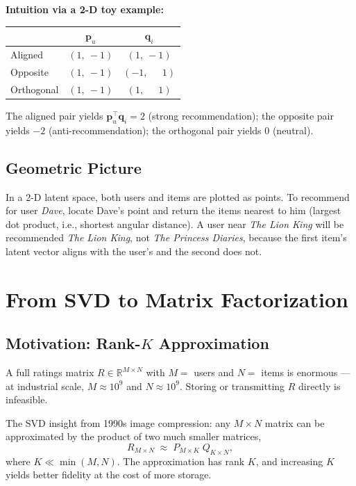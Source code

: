 \documentclass[11pt]{article}
\begin{document}
\textbf{Intuition via a 2-D toy example:}
\begin{center}
\begin{tabular}{@{}lcc@{}}
\toprule
 & $\mathbf{p}_u$ & $\mathbf{q}_i$ \\
\midrule
Aligned      & $(1,\ -1)$ & $(1,\ -1)$ \\
Opposite     & $(1,\ -1)$ & $(-1,\ \phantom{-}1)$ \\
Orthogonal   & $(1,\ -1)$ & $(1,\ \phantom{-}1)$ \\
\bottomrule
\end{tabular}
\end{center}
The aligned pair yields $\mathbf{p}_u^\top \mathbf{q}_i = 2$ (strong recommendation); the opposite pair yields $-2$ (anti-recommendation); the orthogonal pair yields $0$ (neutral).

\subsection{Geometric Picture}
In a 2-D latent space, both users and items are plotted as points. To recommend for user \emph{Dave}, locate Dave's point and return the items nearest to him (largest dot product, i.e., shortest angular distance). A user near \emph{The Lion King} will be recommended \emph{The Lion King}, not \emph{The Princess Diaries}, because the first item's latent vector aligns with the user's and the second does not.


\section{From SVD to Matrix Factorization}

\subsection{Motivation: Rank-$K$ Approximation}
A full ratings matrix $R \in \mathbb{R}^{M \times N}$ with $M =$ users and $N =$ items is enormous --- at industrial scale, $M \approx 10^{9}$ and $N \approx 10^{9}$. Storing or transmitting $R$ directly is infeasible.

The SVD insight from 1990s image compression: any $M \times N$ matrix can be approximated by the product of two much smaller matrices,
\begin{equation}
    R_{M \times N} \;\approx\; P_{M \times K} \; Q_{K \times N},
\end{equation}
where $K \ll \min(M,N)$. The approximation has rank $K$, and increasing $K$ yields better fidelity at the cost of more storage.
\end{document}
